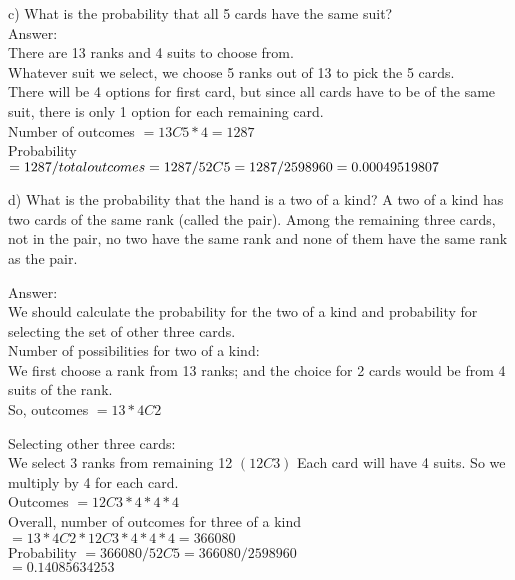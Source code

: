 \documentclass[14pt]{extreport}
\begin{document}
\begin{enumerate}[label=(\alph*)]
\newpage

c) What is the probability that all 5 cards have the same suit?\\

Answer:\\
There are 13 ranks and 4 suits to choose from. \\
Whatever suit we select, we choose 5 ranks out of 13 to pick the 5 cards.\\
There will be 4 options for first card, but since all cards have to be of the same suit, there is only 1 option for each remaining card.\\

Number of outcomes $ = 13C5 * 4 = 1287$ \\

Probability $ = 1287 / total outcomes = 1287 / 52C5 = 1287 / 2598960 \\
= 0.00049519807$
\newline

d) What is the probability that the hand is a two of a kind? A two of a kind has two cards of the same rank (called the pair). Among the remaining three cards, not in the pair, no two have the same rank and none of them have the same rank as the pair. 
\newline

Answer:\\
We should calculate the probability for the two of a kind and probability for selecting the set of other three cards.\\

Number of possibilities for two of a kind:\\
We first choose a rank from 13 ranks; and the choice for 2 cards would be from 4 suits of the rank.\\
So, outcomes $ = 13 * 4C2 $
\newline

Selecting other three cards:\\
We select 3 ranks from remaining 12 $\left( 12C3 \right)$
Each card will have 4 suits. So we multiply by 4 for each card. \\
Outcomes $ = 12C3 * 4 * 4 * 4 $ \\

Overall, number of outcomes for three of a kind $ = 13 * 4C2 * 12C3 * 4 * 4 * 4 = 366080$\\

Probability $= 366080 / 52C5 = 366080 / 2598960 $ \\
 $= 0.14085634253$
 \newpage
 

\end{enumerate}
\end{document}
